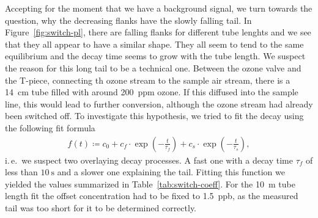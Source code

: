 Accepting for the moment that we have a background  signal, we
turn towards the question, why the decreasing flanks have the slowly
falling tail. In Figure~\ref{fig:switch-pl}, there are falling flanks for
different tube lenghts and we see that they all appear to have a
similar shape. They all seem to tend to the same equilibrium and the
decay time seems to grow with the tube length. We suspect the reason
for this long tail to be a technical one. Between the ozone valve and
the T-piece, connecting th ozone stream to the sample air stream,
there is a \SI{14}{\centi\meter} tube filled with around
\SI{200}{ppm} ozone. If this diffused into the sample line, this would
lead to further  conversion, although the ozone stream had 
already been switched off. To investigate this hypothesis, we tried to fit
the decay using the following fit formula
\begin{align}
  f(t) \coloneqq c_0 + c_f \cdot\exp\left( -\frac{t}{\tau_f}\right) +
  c_s \cdot \exp\left(-\frac{t}{\tau_s}\right), \label{eq:switch-fit}
\end{align}
i.\,e.\ we suspect two overlaying decay processes. A fast one with a
decay time $\tau_f$ of less than $\SI{10}{\second}$ and a slower one
explaining the tail. Fitting this function we yielded the values
summarized in Table~\ref{tab:switch-coeff}. For the \SI{10}{\meter}
tube length fit the offset concentration had to be fixed to
\SI{1.5}{ppb}, as the measured tail was too short for it to be
determined correctly.

